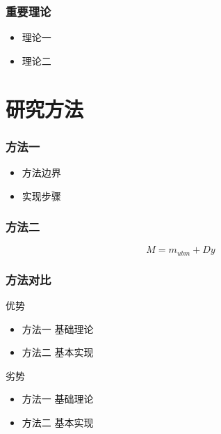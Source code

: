 \documentclass[12pt]{ctexbeamer}	%
\begin{document}
\begin{frame}
    \frametitle{重要理论}
    \begin{itemize}
        \item<1-> 理论一
        \item<2-> 理论二
    \end{itemize}
\end{frame}


\section{研究方法}

\begin{frame}
    \frametitle{方法一}
    
    \begin{itemize}
        \item<1-> 方法边界
        \item<2-> 实现步骤
    \end{itemize}
\end{frame}


\begin{frame}
\frametitle{方法二}
$$M=m_{ubm}+Dy$$
\end{frame}


\begin{frame}
    \frametitle{方法对比}
    \begin{block}{优势}
        \begin{itemize}
            \item \alert{方法一} 基础理论
            \item \alert{方法二} 基本实现
        \end{itemize}
    \end{block}
    \pause
    \begin{block}{劣势}
        \begin{itemize}
            \item \alert{方法一} 基础理论
            \item \alert{方法二} 基本实现
        \end{itemize}
    \end{block}
\end{frame}
\end{document}
